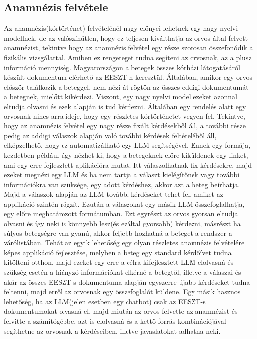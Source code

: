 \documentclass{article}
\begin{document}
\begin{multicols}{2}
\subsection{Anamnézis felvétele}
Az anamnézis(kórtörténet) felvételénél nagy előnyei lehetnek egy nagy nyelvi modellnek, de az valószínűtlen, hogy ez teljesen kiválthatja az orvos által felvett anamnézist, tekintve hogy az anamnézis felvétel egy része szorosan összefonódik a fizikális vizsgálattal. Amiben ez rengeteget tudna segíteni az orvosnak, az a plusz információ mennyiség. Magyarországon a betegek összes kórházi látogatásáról készült dokumentum elérhető az EESZT-n keresztül. Általában, amikor egy orvos először találkozik a beteggel, nem nézi át rögtön az összes eddigi dokumentumát a betegnek, mielőtt kikérdezi. Viszont, egy nagy nyelvi model ezeket azonnal eltudja olvasni és ezek alapján is tud kérdezni. Általában egy rendelés alatt egy orvosnak nincs arra ideje, hogy egy részletes kórtörténetet vegyen fel. Tekintve, hogy az anamnézis felvétel egy nagy része fixált kérdésekből áll, a további része pedig az addigi válaszok alapján való további kérdések feltételéből áll, elképzelhető, hogy ez automatizálható egy LLM segítségével. Ennek egy formája, kezdetben például úgy nézhet ki, hogy a betegeknek előre kiküldenek egy linket, ami egy erre fejlesztett aplikációra mutat. Itt válaszolhatnak fix kérdésekre, majd ezeket megnézi egy LLM és ha nem tartja a választ kielégítőnek vagy további információkra van szüksége, egy adott kérdéshez, akkor azt a beteg beírhatja. Majd a válaszok alapján az LLM további kérdéseket tehet fel, amiket az applikáció szintén rögzít. Ezután a válaszokat egy másik LLM összefoglalhatja, egy előre meghatározott formátumban. Ezt egyrészt az orvos gyorsan eltudja olvasni és így neki is könnyebb lesz(és ezáltal gyorsabb) kérdezni, másrészt ha súlyos betegségre van gyanú, akkor feljebb hozhatná a beteget a rendszer a várólistában. Tehát az egyik lehetőség egy olyan részletes anamnézis felvételére képes applikáció fejlesztése, melyben a beteg egy standard kérdőívet tudna kitölteni otthon, majd ezeket egy erre a célra kifejlesztett LLM elolvasná és szükség esetén a hiányzó információkat elkérné a betegtől, illetve a válaszai és akár az összes EESZT-s dokumentuma alapján egyszerre újabb kérdéseket tudna feltenni, majd erről az orvosnak egy összefoglalót küldene. Egy másik hasznos lehetőség, ha az LLM(jelen esetben egy chatbot) csak az EESZT-s dokumentumokat olvasná el, majd miután az orvos felvette az anamnézist és felvitte a számítógépbe, azt is elolvasná és a kettő forrás kombinációjával segíthetne az orvosnak a kérdéseiben, illetve javaslatokat adhatna neki.

\end{multicols}
\end{document}
